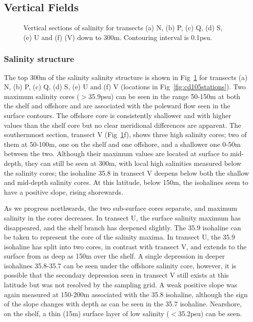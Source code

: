 \FloatBarrier
\subsection{Vertical Fields}
\begin{figure}[!th]
\centering {}%
 
 
\caption{Vertical sections of
salinity for transects (a) N, (b) P, (c) Q, (d) S, (e) U and (f)
(V) down to 300m. Contouring interval is 0.1psu. }
\label{fig:cd105_sec_S}\end{figure}
\subsubsection{Salinity structure}
The top 300m of the salinity salinity structure is shown in
Fig~\ref{fig:cd105_sec_S} for transects (a) N, (b) P, (c) Q, (d)
S, (e) U and (f) V (locations in Fig~\ref{fig:cd105stations}). Two
maximum salinity cores ($>$35.9psu) can be seen in the range
50-150m at both the shelf and offshore and are associated with the
poleward flow seen in the surface contours. The offshore core is
consistently shallower and with higher values than the shelf core
but no clear meridional differences are apparent. The southernmost
section, transect V (Fig~\ref{fig:cd105_sec_S}f), shows three high
salinity cores; two of them at 50-100m, one on the shelf and one
offshore, and a shallower one 0-50m between the two. Although
their maximum values are located at surface to mid-depth, they can
still be seen at 300m, with local high salinities measured below
the salinity cores; the isohaline 35.8 in transect V deepens below
both the shallow and mid-depth salinity cores. At this latitude,
below 150m, the isohalines seem to have a positive slope, rising
shorewards.

As we progress northwards, the two sub-surface cores separate, and
maximum salinity in the cores decreases. In transect U, the
surface salinity maximum has disappeared, and the shelf branch has
deepened slightly. The 35.9 isohaline can be taken to represent
the core of the salinity maxima. In transect U, the 35.9 isohaline
has split into two cores, in contrast with transect V, and extends
to the surface from as deep as 150m over the shelf. A single
depression in deeper isohalines 35.8-35.7 can be seen under the
offshore salinity core, however, it is possible that the secondary
depression seen in transect V still exists at this latitude but
was not resolved by the sampling grid. A weak positive slope was
again measured at 150-200m associated with the 35.8 isohaline,
although the sign of the slope changes with depth as can be seen
in the 35.7 isohaline. Nearshore, on the shelf, a thin (15m)
surface layer of low salinity ($<$35.2psu) can be seen.

